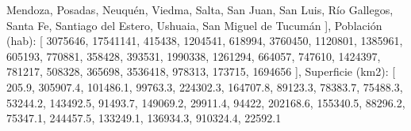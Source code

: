 \documentclass[
  letterpaper,
  DIV=11,
  numbers=noendperiod]{scrreprt}
\newenvironment{Shaded}{\begin{snugshade}}{\end{snugshade}}
\newcommand{\DecValTok}[1]{\textcolor[rgb]{0.68,0.00,0.00}{#1}}
\newcommand{\FloatTok}[1]{\textcolor[rgb]{0.68,0.00,0.00}{#1}}
\newcommand{\NormalTok}[1]{\textcolor[rgb]{0.00,0.23,0.31}{#1}}
\newcommand{\StringTok}[1]{\textcolor[rgb]{0.13,0.47,0.30}{#1}}
\begin{document}
\begin{enumerate}
\begin{Shaded}
\begin{Highlighting}[]
        \StringTok{\textquotesingle{}Mendoza\textquotesingle{}}\NormalTok{, }\StringTok{\textquotesingle{}Posadas\textquotesingle{}}\NormalTok{, }\StringTok{\textquotesingle{}Neuquén\textquotesingle{}}\NormalTok{, }\StringTok{\textquotesingle{}Viedma\textquotesingle{}}\NormalTok{, }\StringTok{\textquotesingle{}Salta\textquotesingle{}}\NormalTok{, }\StringTok{\textquotesingle{}San Juan\textquotesingle{}}\NormalTok{, }\StringTok{\textquotesingle{}San Luis\textquotesingle{}}\NormalTok{,}
        \StringTok{\textquotesingle{}Río Gallegos\textquotesingle{}}\NormalTok{, }\StringTok{\textquotesingle{}Santa Fe\textquotesingle{}}\NormalTok{, }\StringTok{\textquotesingle{}Santiago del Estero\textquotesingle{}}\NormalTok{, }\StringTok{\textquotesingle{}Ushuaia\textquotesingle{}}\NormalTok{, }\StringTok{\textquotesingle{}San Miguel de Tucumán\textquotesingle{}}
\NormalTok{    ],}
    \StringTok{\textquotesingle{}Población (hab)\textquotesingle{}}\NormalTok{: [}
        \DecValTok{3075646}\NormalTok{, }\DecValTok{17541141}\NormalTok{, }\DecValTok{415438}\NormalTok{, }\DecValTok{1204541}\NormalTok{, }\DecValTok{618994}\NormalTok{, }\DecValTok{3760450}\NormalTok{, }\DecValTok{1120801}\NormalTok{, }\DecValTok{1385961}\NormalTok{,}
        \DecValTok{605193}\NormalTok{, }\DecValTok{770881}\NormalTok{, }\DecValTok{358428}\NormalTok{, }\DecValTok{393531}\NormalTok{, }\DecValTok{1990338}\NormalTok{, }\DecValTok{1261294}\NormalTok{, }\DecValTok{664057}\NormalTok{, }\DecValTok{747610}\NormalTok{,}
        \DecValTok{1424397}\NormalTok{, }\DecValTok{781217}\NormalTok{, }\DecValTok{508328}\NormalTok{, }\DecValTok{365698}\NormalTok{, }\DecValTok{3536418}\NormalTok{, }\DecValTok{978313}\NormalTok{, }\DecValTok{173715}\NormalTok{, }\DecValTok{1694656}
\NormalTok{    ],}
    \StringTok{\textquotesingle{}Superficie (km2)\textquotesingle{}}\NormalTok{: [}
        \FloatTok{205.9}\NormalTok{, }\FloatTok{305907.4}\NormalTok{, }\FloatTok{101486.1}\NormalTok{, }\FloatTok{99763.3}\NormalTok{, }\FloatTok{224302.3}\NormalTok{, }\FloatTok{164707.8}\NormalTok{, }\FloatTok{89123.3}\NormalTok{, }\FloatTok{78383.7}\NormalTok{,}
        \FloatTok{75488.3}\NormalTok{, }\FloatTok{53244.2}\NormalTok{, }\FloatTok{143492.5}\NormalTok{, }\FloatTok{91493.7}\NormalTok{, }\FloatTok{149069.2}\NormalTok{, }\FloatTok{29911.4}\NormalTok{, }\DecValTok{94422}\NormalTok{, }\FloatTok{202168.6}\NormalTok{,}
        \FloatTok{155340.5}\NormalTok{, }\FloatTok{88296.2}\NormalTok{, }\FloatTok{75347.1}\NormalTok{, }\FloatTok{244457.5}\NormalTok{, }\FloatTok{133249.1}\NormalTok{, }\FloatTok{136934.3}\NormalTok{, }\FloatTok{910324.4}\NormalTok{, }\FloatTok{22592.1}

\end{Highlighting}
\end{Shaded}
\end{enumerate}
\end{document}
